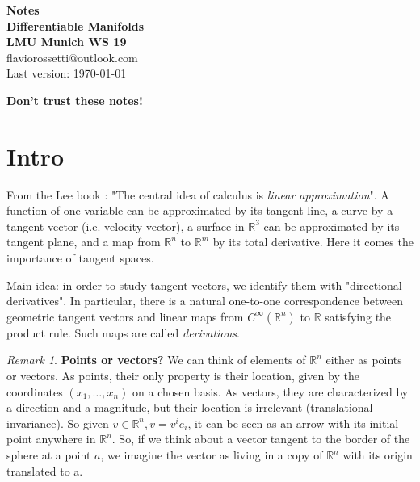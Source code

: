 \documentclass[a4paper,11pt,titlepage]{article}
\numberwithin{equation}{section}
\theoremstyle{definition}
\theoremstyle{remark}
\newtheorem{remark}[theorem]{Remark}
\newcommand{\rfield}{\mathbb{R}}
\begin{document}
\begin{titlepage}
\begin{center}
 {\huge\bfseries Notes \\ Differentiable Manifolds \\ LMU Munich WS 19 \\}
 \vspace{1.5cm}
 flaviorossetti@outlook.com\\[14pt]
  \vfill
  Last version: \today
\end{center}
\end{titlepage}

\newpage
\begin{center}
 {\huge\bfseries Don't trust these notes! \\}

  \vfill
\end{center}
\newpage


\tableofcontents
\clearpage


\section{Intro}

From the Lee book \cite{Lee}: "The central idea of calculus is \textit{linear approximation}". A function of one variable can be approximated by its tangent line, a curve by a tangent vector (i.e. velocity vector), a surface in $\rfield^3$ can be approximated by its tangent plane, and a map from $\rfield^n$ to $\rfield^m$ by its total derivative.
Here it comes the importance of tangent spaces.

Main idea: in order to study tangent vectors, we identify them with "directional derivatives". In particular, there is a natural one-to-one correspondence between geometric tangent vectors and linear maps from $C^{\infty}(\rfield^n)$ to $\rfield$ satisfying the product rule. Such maps are called \textit{derivations}.


\begin{remark} \label{pointorvec}
\textbf{Points or vectors?} We can think of elements of $\rfield^n$ either as points or vectors. As points, their only property is their location, given by the coordinates $(x_1, \ldots, x_n)$ on a chosen basis. As vectors, they are characterized by a direction and a magnitude, but their location is irrelevant (translational invariance). So given $v \in \rfield^n, v=v^ie_i$, it can be seen as an arrow with its initial point anywhere in $\rfield^n$. So, if we think about a vector tangent to the border of the sphere at a point $a$, we imagine the vector as living in a copy of $\rfield^n$ with its origin translated to a.

\end{remark}
\newpage
\end{document}
